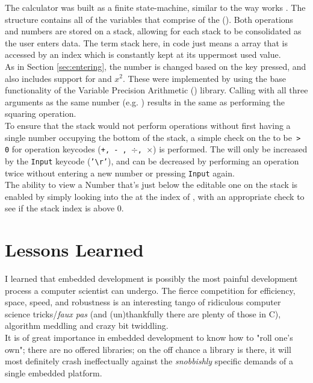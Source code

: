\documentclass{LibHP20b}
\begin{document}
The \RPN{} calculator was built as a finite state-machine, similar to the way  works \cite{openglsuperbible}. The structure  contains all of the variables that comprise of the \HP[] (). Both operations and numbers are stored on a stack, allowing for each stack to be consolidated as the user enters data. The term stack here, in  code just means a  array that is accessed by an index which is constantly kept at its uppermost used value.\\
As in Section \ref{sec:entering}, the number is changed based on the key pressed, and also includes support for  and $x^{2}$. These were implemented by using the base functionality of the Variable Precision Arithmetic () library. Calling  with all three arguments as the same number (e.g. ) results in the same as performing the squaring operation.\\
To ensure that the stack would not perform operations without first having a single number occupying the bottom of the stack, a simple check on the  to be\texttt{ > 0} for operation keycodes (\texttt{+, - , $\div$, $\times$}) is performed. The  will only be increased by  the \texttt{Input} keycode (\texttt{'\textbackslash{}r'}), and can be decreased by performing an operation twice without entering a new number or pressing \texttt{Input} again.\\
The ability to view a Number that's just below the editable one on the stack is enabled by simply looking into the  at the index of , with an appropriate check to see if the stack index is above 0.

\section{Lessons Learned}

I learned that embedded development is possibly the most painful development process a computer scientist can undergo. The fierce competition for efficiency, space, speed, and robustness is an interesting tango of ridiculous computer science tricks/\textit{faux pas} (and (un)thankfully there are plenty of those in C), algorithm meddling and crazy bit twiddling.\\
It is of great importance in embedded development to know how to "roll one's own"; there are no offered libraries; on the off chance a library is there, it will most definitely crash ineffectually against the \emph{snobbishly} specific demands of a single embedded platform.
\end{document}
